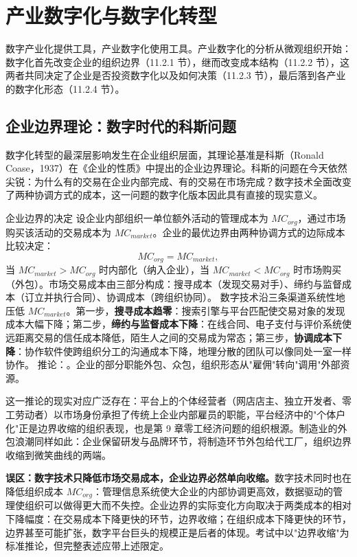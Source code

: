 \section{产业数字化与数字化转型}

数字产业化提供工具，产业数字化使用工具。产业数字化的分析从微观组织开始：数字化首先改变企业的组织边界（11.2.1 节），继而改变成本结构（11.2.2 节），这两者共同决定了企业是否投资数字化以及如何决策（11.2.3 节），最后落到各产业的数字化形态（11.2.4 节）。

\subsection{企业边界理论：数字时代的科斯问题}

数字化转型的最深层影响发生在企业组织层面，其理论基准是科斯（Ronald Coase，1937）在《企业的性质》中提出的企业边界理论。科斯的问题在今天依然尖锐：为什么有的交易在企业内部完成、有的交易在市场完成？数字技术全面改变了两种协调方式的成本，这一问题的数字化版本因此具有直接的现实意义。

\begin{derivation}{企业边界的决定}{}
设企业内部组织一单位额外活动的管理成本为 $MC_{org}$，通过市场购买该活动的交易成本为 $MC_{market}$。企业的最优边界由两种协调方式的边际成本比较决定：
\[
MC_{org} = MC_{market},
\]
当 $MC_{market} > MC_{org}$ 时内部化（纳入企业），当 $MC_{market} < MC_{org}$ 时市场购买（外包）。市场交易成本由三部分构成：搜寻成本（发现交易对手）、缔约与监督成本（订立并执行合同）、协调成本（跨组织协同）。
数字技术沿三条渠道系统性地压低 $MC_{market}$。第一步，\textbf{搜寻成本趋零}：搜索引擎与平台匹配使交易对象的发现成本大幅下降；第二步，\textbf{缔约与监督成本下降}：在线合同、电子支付与评价系统使远距离交易的信任成本降低，陌生人之间的交易成为常态；第三步，\textbf{协调成本下降}：协作软件使跨组织分工的沟通成本下降，地理分散的团队可以像同处一室一样协作。
推论：。企业的部分职能外包、众包，组织形态从"雇佣"转向"调用"外部资源。
\end{derivation}

这一推论的现实对应广泛存在：平台上的个体经营者（网店店主、独立开发者、零工劳动者）以市场身份承担了传统上企业内部雇员的职能，平台经济中的"个体户化"正是边界收缩的组织表现，也是第 9 章零工经济问题的组织根源。制造业的外包浪潮同样如此：企业保留研发与品牌环节，将制造环节外包给代工厂，组织边界收缩到微笑曲线的两端。

\begin{misconception}
\textbf{误区：数字技术只降低市场交易成本，企业边界必然单向收缩。}数字技术同时也在降低组织成本 $MC_{org}$：管理信息系统使大企业的内部协调更高效，数据驱动的管理使组织可以做得更大而不失控。企业边界的实际变化方向取决于两类成本的相对下降幅度：在交易成本下降更快的环节，边界收缩；在组织成本下降更快的环节，边界甚至可能扩张，数字平台巨头的规模正是后者的体现。考试中以"边界收缩"为标准推论，但完整表述应带上述限定。
\end{misconception}


